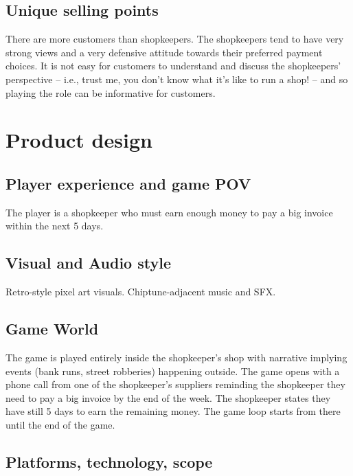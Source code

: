 \documentclass[a4paper,11pt]{article}
\begin{document}
\subsection{Unique selling points}\label{unique-selling-points}

There are more customers than shopkeepers. The shopkeepers tend to have
very strong views and a very defensive attitude towards their preferred
payment choices. It is not easy for customers to understand and discuss
the shopkeepers' perspective -- i.e., trust me, you don't know what it's
like to run a shop! -- and so playing the role can be informative for
customers.

\section{Product design}\label{product-design}

\subsection{Player experience and game
POV}\label{player-experience-and-game-pov}

The player is a shopkeeper who must earn enough money to pay a big
invoice within the next 5 days.

\subsection{Visual and Audio style}\label{visual-and-audio-style}

Retro-style pixel art visuals. Chiptune-adjacent music and SFX.

\subsection{Game World}\label{game-world}

The game is played entirely inside the shopkeeper's shop with narrative
implying events (bank runs, street robberies) happening outside. The
game opens with a phone call from one of the shopkeeper's suppliers
reminding the shopkeeper they need to pay a big invoice by the end of
the week. The shopkeeper states they have still 5 days to earn the
remaining money. The game loop starts from there until the end of the
game.

\subsection{Platforms, technology,
scope}\label{platforms-technology-scope}
\end{document}
